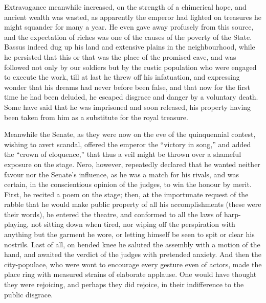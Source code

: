 Extravagance meanwhile increased, on the strength of a chimerical hope, and ancient wealth was wasted, as apparently the emperor had lighted on treasures he might squander for many a year. He even gave away profusely from this source, and the expectation of riches was one of the causes of the poverty of the State. Bassus indeed dug up his land and extensive plains in the neighbourhood, while he persisted that this or that was the place of the promised cave, and was followed not only by our soldiers but by the rustic population who were engaged to execute the work, till at last he threw off his infatuation, and expressing wonder that his dreams had never before been false, and that now for the first time he had been deluded, he escaped disgrace and danger by a voluntary death. Some have said that he was imprisoned and soon released, his property having been taken from him as a substitute for the royal treasure.


Meanwhile the Senate, as they were now on the eve of the quinquennial contest, wishing to avert scandal, offered the emperor the ``victory in song,'' and added the ``crown of eloquence,'' that thus a veil might be thrown over a shameful exposure on the stage. Nero, however, repeatedly declared that he wanted neither favour nor the Senate's influence, as he was a match for his rivals, and was certain, in the conscientious opinion of the judges, to win the honour by merit. First, he recited a poem on the stage; then, at the importunate request of the rabble that he would make public property of all his accomplishments (these were their words), he entered the theatre, and conformed to all the laws of harp-playing, not sitting down when tired, nor wiping off the perspiration with anything but the garment he wore, or letting himself be seen to spit or clear his nostrils. Last of all, on bended knee he saluted the assembly with a motion of the hand, and awaited the verdict of the judges with pretended anxiety. And then the city-populace, who were wont to encourage every gesture even of actors, made the place ring with measured strains of elaborate applause. One would have thought they were rejoicing, and perhaps they did rejoice, in their indifference to the public disgrace.


